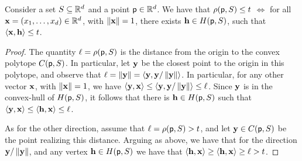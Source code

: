 \begin{lemma}%
    Consider a set $S \subseteq \mathbb{R}^d$ and a point
    $\mathsf{p} \in \mathbb{R}^d$.  We have that $\distTY{\pnt}{\SetA} \leq t$
    $\iff$ for all $\mathbf{x} = (x_1, \ldots, x_d) \in \mathbb{R}^d$, with
    $\left\| {\mathbf{x}} \right\| =1$, there exists
    $\vecH \in \HSetY{\pnt}{\SetA}$,
    such that $\left\langle {{\mathbf{x}},{\mathbf{h}}} \right\rangle\leq t$.
\end{lemma}
\begin{proof}
    The quantity $\ell = \distTY{\pnt}{\SetA}$ is the distance from
    the origin to the convex polytope $\CHSetY{\pnt}{\SetA}$. In
    particular, let $\mathbf{y}$ be the closest point to the origin in this
    polytope, and observe that
    $\ell = \left\| {\mathbf{y}} \right\| = \left\langle {{\mathbf{y}},{\mathbf{y}/\left\| {\mathbf{y}} \right\|}} \right\rangle$. In
    particular, for any other vector $\mathbf{x}$, with $\left\| {\mathbf{x}} \right\| =1$,
    we have
    $\left\langle {{\mathbf{y}},{\mathbf{x}}} \right\rangle \leq \left\langle {{\mathbf{y}},{\mathbf{y}/\left\| {\mathbf{y}} \right\|}} \right\rangle
    \leq \ell$. Since $\mathbf{y}$ is in the convex-hull of
    $\HSetY{\pnt}{\SetA}$, it follows that there is
    $\vecH \in \HSetY{\pnt}{\SetA}$ such that
    $\left\langle {{\mathbf{y}},{\mathbf{x}}} \right\rangle \leq \left\langle {{\mathbf{h}},{\mathbf{x}}} \right\rangle\leq \ell$.

    As for the other direction, assume that
    $\ell = \distTY{\pnt}{\SetA} > t$, and let
    $\vecY \in \CHSetY{\pnt}{\SetA}$ be the point realizing this
    distance. Arguing as above, we have that for the direction
    $\mathbf{y} /\left\| {\mathbf{y}} \right\|$, and any vertex
    $\vecH \in \HSetY{\pnt}{\SetA}$ we have that
    $\left\langle {{\mathbf{h}},{\mathbf{x}}} \right\rangle \geq \left\langle {{\mathbf{h}},{\mathbf{x}}} \right\rangle\geq \ell > t$.
\end{proof}


